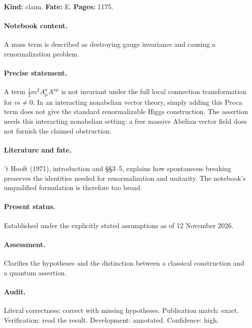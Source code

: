 \label{item:1983-625.2}

\noindent\textbf{Kind:} claim. \textbf{Fate:} E. \textbf{Pages:} 1175.\par

\paragraph{Notebook content.} A mass term is described as destroying gauge invariance and causing a renormalization problem.

\paragraph{Precise statement.} A term \(\frac12m^2 A_\mu^aA^{a\mu}\) is not invariant under the full local connection transformation for \(m\ne0\). In an interacting nonabelian vector theory, simply adding this Proca term does not give the standard renormalizable Higgs construction. The assertion needs this interacting nonabelian setting: a free massive Abelian vector field does not furnish the claimed obstruction.

\paragraph{Literature and fate.} ’t Hooft (1971), introduction and \S\S3–5, explains how spontaneous breaking preserves the identities needed for renormalization and unitarity. The notebook’s unqualified formulation is therefore too broad.

\paragraph{Present status.} Established under the explicitly stated assumptions as of 12 November 2026.

\paragraph{Assessment.} Clarifies the hypotheses and the distinction between a classical construction and a quantum assertion.

\paragraph{Audit.} Literal correctness: correct with missing hypotheses. Publication match: exact. Verification: read the result. Development: annotated. Confidence: high.

